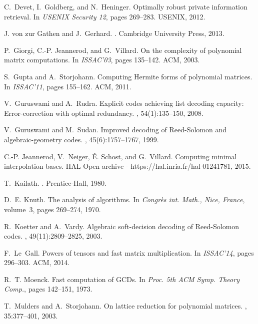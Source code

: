 \documentclass[preprint]{sig-alternate-05-2015}
\begin{document}
\begin{small}
\begin{thebibliography}{10}
C.~Devet, I.~Goldberg, and N.~Heninger.
\newblock Optimally robust private information retrieval.
\newblock In {\em USENIX Security 12}, pages 269--283. USENIX, 2012.

{J. von zur} Gathen and J.~Gerhard.
.
\newblock Cambridge University Press, 2013.

P.~Giorgi, C.-P. Jeannerod, and G.~Villard.
\newblock On the complexity of polynomial matrix computations.
\newblock In {\em ISSAC'03}, pages 135--142. ACM, 2003.

S.~Gupta and A.~Storjohann.
\newblock Computing {Hermite} forms of polynomial matrices.
\newblock In {\em ISSAC'11}, pages 155--162. ACM, 2011.

V.~Guruswami and A.~Rudra.
\newblock Explicit codes achieving list decoding capacity: Error-correction
  with optimal redundancy.
, 54(1):135--150, 2008.

V.~Guruswami and M.~Sudan.
\newblock Improved decoding of {{R}eed-{S}olomon} and algebraic-geometry codes.
, 45(6):1757--1767, 1999.

C.-P. Jeannerod, V.~Neiger, \'E. Schost, and G.~Villard.
\newblock Computing minimal interpolation bases.
\newblock HAL Open archive - https://hal.inria.fr/hal-01241781, 2015.

T.~Kailath.
.
\newblock Prentice-Hall, 1980.

D.~E. Knuth.
\newblock The analysis of algorithms.
\newblock In {\em {Congr\`es int. Math., Nice, France}}, volume~3, pages
  269--274, 1970.

R.~Koetter and A.~Vardy.
\newblock Algebraic soft-decision decoding of {{R}eed-{S}olomon} codes.
, 49(11):2809--2825, 2003.

F.~Le~Gall.
\newblock Powers of tensors and fast matrix multiplication.
\newblock In {\em ISSAC'14}, pages 296--303. ACM, 2014.

R.~T. Moenck.
\newblock Fast computation of {GCD}s.
\newblock In {\em Proc. 5th ACM Symp. Theory Comp.}, pages 142--151, 1973.

T.~Mulders and A.~Storjohann.
\newblock On lattice reduction for polynomial matrices.
, 35:377--401, 2003.


\end{thebibliography}
\end{small}
\end{document}
